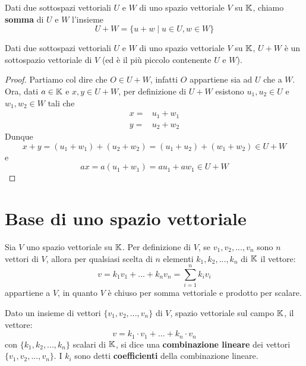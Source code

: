 \begin{definition}
	Dati due sottospazi vettoriali $U$ e $W$ di uno spazio vettoriale $V$ su $\mathbb{K}$, chiamo \textbf{somma}
	di $U$ e $W$ l'insieme
	\[ U + W = \{u + w \mid u \in U, w \in W\} \]
\end{definition}

\begin{proposition}
	Dati due sottospazi vettoriali $U$ e $W$ di uno spazio vettoriale $V$ su $\mathbb{K}$, $U + W$ è un
	sottospazio vettoriale di $V$ (ed è il più piccolo contenente $U$ e $W$).
	\begin{proof}
		Partiamo col dire che $O \in U + W$, infatti $O$ appartiene sia ad $U$ che a $W$. Ora, dati
		$a \in \mathbb{K}$ e $x, y \in U + W$, per definizione di $U + W$ esistono $u_1, u_2 \in U$ e
		$w_1, w_2 \in W$ tali che
		\begin{align*}
			x = & u_1 + w_1 \\ y = & u_2 + w_2
		\end{align*}
		Dunque
		\[ x + y = (u_1 + w_1) + (u_2 + w_2) = (u_1 + u_2) + (w_1 + w_2) \in U + W \]
		e
		\[ ax = a(u_1 + w_1) = au_1 + aw_1 \in U + W \]
	\end{proof}
\end{proposition}

\section{Base di uno spazio vettoriale}
Sia $V$ uno spazio vettoriale su $\mathbb{K}$. Per definizione di $V$, se $v_1, v_2, ..., v_n$ sono $n$ vettori
di $V$, allora per qualsiasi scelta di $n$ elementi $k_1, k_2, ..., k_n$ di $\mathbb{K}$ il vettore:
\[ v = k_1 v_1 + ... + k_n v_n = \sum_{i=1}^n k_i v_i \]
appartiene a $V$, in quanto $V$ è chiuso per somma vettoriale e prodotto per scalare.

\begin{definition}
	Dato un insieme di vettori $\{v_1, v_2, ..., v_n\}$ di $V$, spazio vettoriale sul campo $\mathbb{K}$, il
	vettore:
	\[ v = k_1 \cdot v_1 + ... + k_n \cdot v_n \]
	con $\{k_1, k_2, ..., k_n\}$ scalari di $\mathbb{K}$, si dice una \textbf{combinazione lineare} dei vettori
	$\{v_1, v_2, ..., v_n\}$. I $k_i$ sono detti \textbf{coefficienti} della combinazione lineare.
\end{definition}

